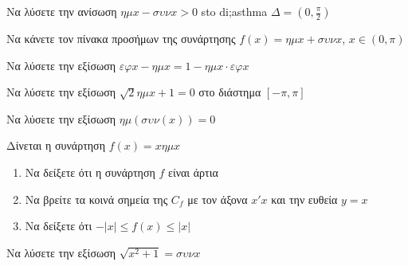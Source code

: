\documentclass{presentation}
\begin{document}
\begin{askisi}
  Να λύσετε την ανίσωση $ημx-συνx>0$ sto di;asthma $Δ=(0,\frac{π}{2})$

\end{askisi}

\begin{askisi}
  Να κάνετε τον πίνακα προσήμων της συνάρτησης $f(x)=ημx+συνx$, $x\in (0,π)$

\end{askisi}

\begin{askisi}
  Να λύσετε την εξίσωση $εφx-ημx=1-ημx\cdot εφx$

\end{askisi}

\begin{askisi}
  Να λύσετε την εξίσωση $\sqrt{2}ημx+1=0$ στο διάστημα $[-π,π]$

\end{askisi}

\begin{askisi}
  Να λύσετε την εξίσωση $ημ(συν(x))=0$

\end{askisi}

\begin{askisi}
  Δίνεται η συνάρτηση $f(x)=xημx$
  \begin{enumerate}
    \item<1-> Να δείξετε ότι η συνάρτηση $f$ είναι άρτια
    \item<2-> Να βρείτε τα κοινά σημεία της $C_f$ με τον άξονα $x'x$ και την ευθεία $y=x$
    \item<3-> Να δείξετε ότι $-|x|\le f(x) \le |x|$
  \end{enumerate}
\end{askisi}

\begin{askisi}
  Να λύσετε την εξίσωση $\sqrt{x^2+1}=συνx$

\end{askisi}

\moodle

\end{document}
